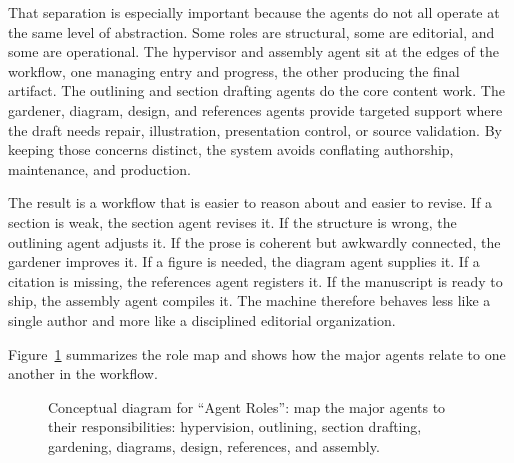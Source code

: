 That separation is especially important because the agents do not all operate at the same level of abstraction. Some roles are structural, some are editorial, and some are operational. The hypervisor and assembly agent sit at the edges of the workflow, one managing entry and progress, the other producing the final artifact. The outlining and section drafting agents do the core content work. The gardener, diagram, design, and references agents provide targeted support where the draft needs repair, illustration, presentation control, or source validation. By keeping those concerns distinct, the system avoids conflating authorship, maintenance, and production.

The result is a workflow that is easier to reason about and easier to revise. If a section is weak, the section agent revises it. If the structure is wrong, the outlining agent adjusts it. If the prose is coherent but awkwardly connected, the gardener improves it. If a figure is needed, the diagram agent supplies it. If a citation is missing, the references agent registers it. If the manuscript is ready to ship, the assembly agent compiles it. The machine therefore behaves less like a single author and more like a disciplined editorial organization.

Figure~\ref{fig:ch04_sec01_agent_roles} summarizes the role map and shows how the major agents relate to one another in the workflow.

\begin{figure}[htbp]
\centering

\caption{Conceptual diagram for ``Agent Roles'': map the major agents to their responsibilities: hypervision, outlining, section drafting, gardening, diagrams, design, references, and assembly.}
\label{fig:ch04_sec01_agent_roles}
\end{figure}
